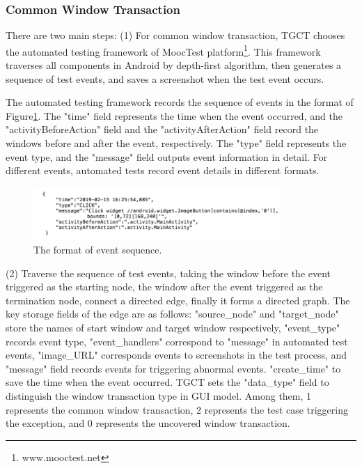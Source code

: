 \subsubsection{Common Window Transaction}
There are two main steps:
(1) For common window transaction, TGCT chooses the automated testing framework of MoocTest platform\footnote{www.mooctest.net}. This framework traverses all components in Android by depth-first algorithm, then generates a sequence of test events, and saves a screenshot when the test event occurs. 

The automated testing framework records the sequence of events in the format of Figure\ref{fig:foramt}. The "time" field represents the time when the event occurred, and the "activityBeforeAction" field and the "activityAfterAction" field record the windows before and after the event, respectively. The "type" field represents the event type, and the "message" field outputs event information in detail. For different events, automated tests record event details in different formats.
\begin{figure}[htbp]
\centering
\centerline{\includegraphics[width=\columnwidth,height=2cm]{fig/4.png}}
\caption{The format of event sequence.}
\label{fig:foramt}
\end{figure}
(2) Traverse the sequence of test events, taking the window before the event triggered as the starting node, the window after the event triggered as the termination node, connect a directed edge, finally it forms a directed graph.
The key storage fields of the edge are as follows: "source\_node" and "target\_node" store the names of start window and target window respectively, "event\_type" records event type, "event\_handlers" correspond to "message" in automated test events, "image\_URL" corresponds events to screenshots in the test process, and "message" field records events for triggering abnormal events. "create\_time" to save the time when the event occurred. TGCT sets the "data\_type" field to distinguish the window transaction type in GUI model. Among them, 1 represents the common window transaction, 2 represents the test case triggering the exception, and 0 represents the uncovered window transaction.

